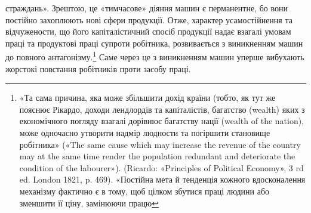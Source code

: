 страждань». Зрештою, це «тимчасове» діяння машин є перманентне,
бо вони постійно захоплюють нові сфери продукції. Отже,
характер усамостійнення та відчужености, що його капіталістичний
спосіб продукції надає взагалі умовам праці та продуктові
праці супроти робітника, розвивається з виникненням
машин до повного антагонізму.\footnote{
«Та сама причина, яка може збільшити дохід країни (тобто, як
тут же пояснює Рікардо, доходи лендлордів та капіталістів, багатство
(wealth) яких з економічного погляду взагалі дорівнює багатству нації
(wealth of the nation), може одночасно утворити надмір людности та
погіршити становище робітника» («The same cause which may increase
the revenue of the country may at the same time render the population
redundant and deteriorate the condition of the labourer»). (Ricardo:
«Principles of Political Economy», 3 rd ed. London 1821, p. 469). «Постійна
мета й тенденція кожного вдосконалення механізму фактично є в тому,
щоб цілком збутися праці людини або зменшити її ціну, замінюючи працю
} Саме через це з виникненням
машин уперше вибухають жорстокі повстання робітників проти
засобу праці.

